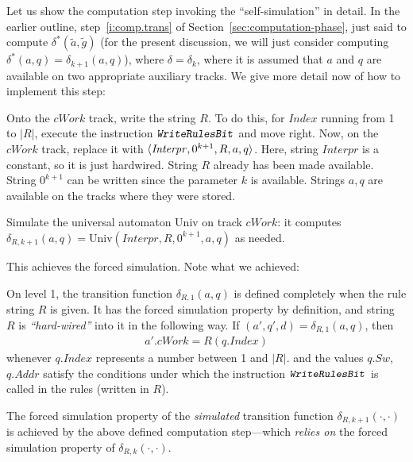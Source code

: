 \documentclass[12pt]{memoir}
\newcommand{\fld}[1]{\ensuremath{\textit{#1}}}
\newcommand{\rul}[1]{\ensuremath{\texttt{\slshape #1\/}}}
\newcommand{\Addr}{\fld{Addr}}
\newcommand{\Index}{\fld{Index}}
\newcommand{\Sweep}{\fld{Sw}}
\newcommand{\cWork}{\fld{cWork}}
\newcommand{\Interpr}{\mathit{Interpr}}
\newcommand{\Un}{\mathrm{Univ}}
\newcommand{\WriteRulesBit}{\rul{WriteRulesBit}}
\begin{document}
Let us show the computation step invoking the ``self-simulation'' in detail.
In the earlier outline, step~\ref{i:comp.trans} of Section~\ref{sec:computation-phase},
just said to compute \( \delta^{*}(\tilde a, \tilde g) \)
(for the present discussion, we will just consider computing 
\( \delta^{*}(a,q)=\delta_{k+1}(a,q) \)), where \( \delta=\delta_{k} \),
where it is assumed that \( a \) and \( q \) are available on two appropriate
auxiliary tracks.
We give more detail now of how to implement this step:

\begin{enumerate}[1.]
\item Onto the \( \cWork \) track, write the string \( R \).
To do this, for \( \Index \) running from 1 to \( |R| \), 
execute the instruction \( \WriteRulesBit \) and move right.
Now, on the \( \cWork  \) track, replace it with \( \ang{\Interpr,0^{k+1},R,a,q} \).
Here, string \( \Interpr \) is a constant, so it is just hardwired.
String \( R \) already has been made available.
String \( 0^{k+1} \) can be written since the parameter \( k \) is available.
Strings \( a,q \) are available on the tracks where they were stored.
\begin{sloppypar}
 \item Simulate the universal automaton \( \Un \) on track \( \cWork \):
   it computes \( \delta_{R,k+1}(a,q)=\Un(\Interpr,R,0^{k+1}, a,q) \)
as needed.  
\end{sloppypar}
\end{enumerate}

This achieves the forced simulation.
Note what we achieved:

\begin{itemize}
  \begin{sloppypar}
\item On level 1, the transition function \( \delta_{R,1}(a,q) \) is defined completely
when the rule string \( R \) is given.
It has the forced simulation property by definition, and
string \( R \) is \emph{``hard-wired''} into it in the following way.
If \( (a',q',d)=\delta_{R,1}(a,q) \), then
\begin{align*}
  a'.\cWork=R(q.\Index)
\end{align*}
whenever \( q.\Index \) represents a number between 1 and \( |R| \).
and the values \( q.\Sweep \), \( q.\Addr \) satisfy the conditions
under which the instruction \( \WriteRulesBit \) is 
called in the rules (written in \( R \)).
      \end{sloppypar}

      \begin{sloppypar}
\item The forced simulation property of the \emph{simulated}
transition function \( \delta_{R,k+1}(\cdot,\cdot) \) is 
achieved by the above defined computation 
step---which \emph{relies on} the forced simulation property of \( \delta_{R,k}(\cdot,\cdot) \).
              \end{sloppypar}
\end{itemize}
\end{document}
